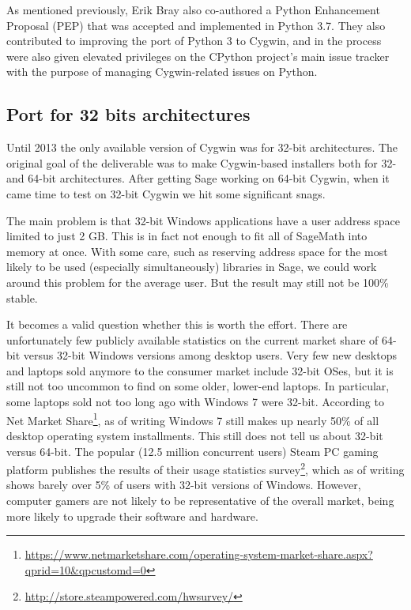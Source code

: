 As mentioned previously, Erik Bray also co-authored a Python Enhancement
Proposal (PEP) that was accepted and implemented in Python 3.7.  They also
contributed to improving the port of Python 3 to Cygwin, and in the process
were also given elevated privileges on the CPython project's main issue tracker
with the purpose of managing Cygwin-related issues on Python.


\hypertarget{port-for-32-bits-architectures}{%
\subsection{Port for 32 bits
architectures}\label{port-for-32-bits-architectures}}

Until 2013 the only available version of Cygwin was for 32-bit
architectures. The original goal of the deliverable was to make
Cygwin-based installers both for 32- and 64-bit architectures. After
getting Sage working on 64-bit Cygwin, when it came time to test on
32-bit Cygwin we hit some significant snags.

The main problem is that 32-bit Windows applications have a user address
space limited to just 2 GB. This is in fact not enough to fit all of
SageMath into memory at once. With some care, such as reserving address
space for the most likely to be used (especially simultaneously)
libraries in Sage, we could work around this problem for the average user.
But the result may still not be 100\% stable.

It becomes a valid question whether this is worth the effort. There are
unfortunately few publicly available statistics on the current market
share of 64-bit versus 32-bit Windows versions among desktop users. Very
few new desktops and laptops sold anymore to the consumer market include
32-bit OSes, but it is still not too uncommon to find on some older,
lower-end laptops. In particular, some laptops sold not too long ago
with Windows 7 were 32-bit. According to Net Market Share\footnote{\url{https://www.netmarketshare.com/operating-system-market-share.aspx?qprid=10\&qpcustomd=0}},
as of writing Windows 7 still makes up nearly 50\% of all desktop
operating system installments. This still does not tell us about 32-bit
versus 64-bit. The popular (12.5 million concurrent users) Steam PC
gaming platform publishes the results of their usage statistics
survey\footnote{\url{http://store.steampowered.com/hwsurvey/}}, which as
of writing shows barely over 5\% of users with 32-bit versions of
Windows. However, computer gamers are not likely to be representative of
the overall market, being more likely to upgrade their software and
hardware.


